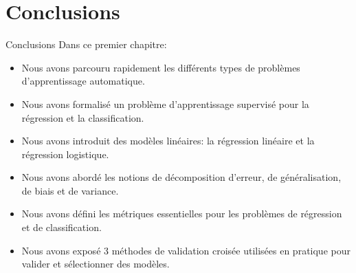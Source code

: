 \section[Conclusions]{Conclusions}

\begin{frame}{Conclusions}
	Dans ce premier chapitre:
	\begin{itemize}
		\item Nous avons parcouru rapidement les différents types de problèmes d'apprentissage automatique.
		\item Nous avons formalisé un problème d'apprentissage supervisé pour la régression et la classification.
		\item Nous avons introduit des modèles linéaires: la régression linéaire et la régression logistique.
		\item Nous avons abordé les notions de décomposition d'erreur, de généralisation, de biais et de variance.
		\item Nous avons défini les métriques essentielles pour les problèmes de régression et de classification.
		\item Nous avons exposé 3 méthodes de validation croisée utilisées en pratique pour valider et sélectionner des modèles.
	\end{itemize}
\end{frame}
